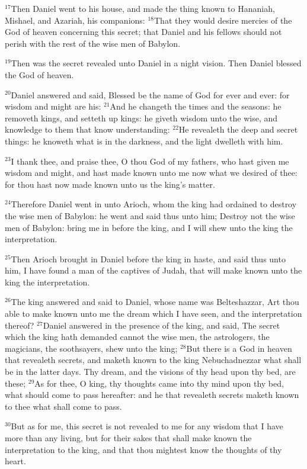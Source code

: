 \documentclass[12pt]{article}
\begin{document}
$^{17}$Then Daniel went to his house, and made the thing known to
Hananiah, Mishael, and Azariah, his companions: $^{18}$That they would
desire mercies of the God of heaven concerning this secret; that
Daniel and his fellows should not perish with the rest of the wise men
of Babylon.


$^{19}$Then was the secret revealed unto Daniel in a night vision. Then
Daniel blessed the God of heaven.


$^{20}$Daniel answered and said, Blessed be the name of God for ever and
ever: for wisdom and might are his: $^{21}$And he changeth the times and
the seasons: he removeth kings, and setteth up kings: he giveth wisdom
unto the wise, and knowledge to them that know understanding: $^{22}$He
revealeth the deep and secret things: he knoweth what is in the
darkness, and the light dwelleth with him.


$^{23}$I thank thee, and praise thee, O thou God of my fathers, who hast
given me wisdom and might, and hast made known unto me now what we
desired of thee: for thou hast now made known unto us the king's
matter.


$^{24}$Therefore Daniel went in unto Arioch, whom the king had ordained
to destroy the wise men of Babylon: he went and said thus unto him;
Destroy not the wise men of Babylon: bring me in before the king, and
I will shew unto the king the interpretation.


$^{25}$Then Arioch brought in Daniel before the king in haste, and said
thus unto him, I have found a man of the captives of Judah, that will
make known unto the king the interpretation.


$^{26}$The king answered and said to Daniel, whose name was
Belteshazzar, Art thou able to make known unto me the dream which I
have seen, and the interpretation thereof?  $^{27}$Daniel answered in
the presence of the king, and said, The secret which the king hath
demanded cannot the wise men, the astrologers, the magicians, the
soothsayers, shew unto the king; $^{28}$But there is a God in heaven
that revealeth secrets, and maketh known to the king Nebuchadnezzar
what shall be in the latter days. Thy dream, and the visions of thy
head upon thy bed, are these; $^{29}$As for thee, O king, thy thoughts
came into thy mind upon thy bed, what should come to pass hereafter:
and he that revealeth secrets maketh known to thee what shall come to
pass.


$^{30}$But as for me, this secret is not revealed to me for any wisdom
that I have more than any living, but for their sakes that shall make
known the interpretation to the king, and that thou mightest know the
thoughts of thy heart.
\end{document}
